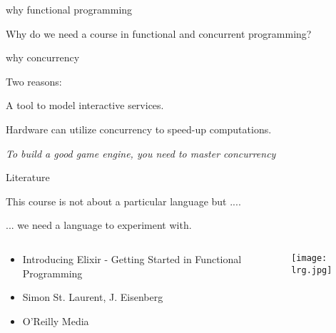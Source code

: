 \begin{frame}{why functional programming}

Why do we need a course in functional and concurrent programming?


\end{frame}

\begin{frame}{why concurrency}

Two reasons:

\pause\vspace{20pt}\hspace{60pt}A tool to model interactive services.

\pause\vspace{20pt}\hspace{60pt}Hardware can utilize concurrency to speed-up computations.

\pause\vspace{40pt}
{\em To build a good game engine, you need to master concurrency}

\end{frame}


\begin{frame}{Literature}

  This course is not about a particular language but .... \pause

  \vspace{20pt}\hspace{40pt} ... we need a language to experiment with.

\pause
\begin{columns}
 \begin{column}{0.6\linewidth}
   \begin{itemize}
   \item Introducing Elixir - Getting Started in Functional Programming
   \item Simon St. Laurent, J. Eisenberg
   \item O'Reilly Media
   \end{itemize}
 \end{column}
 \begin{column}{0.4\linewidth}
    \texttt{[image: lrg.jpg]}    
 \end{column}
\end{columns}

\end{frame}

